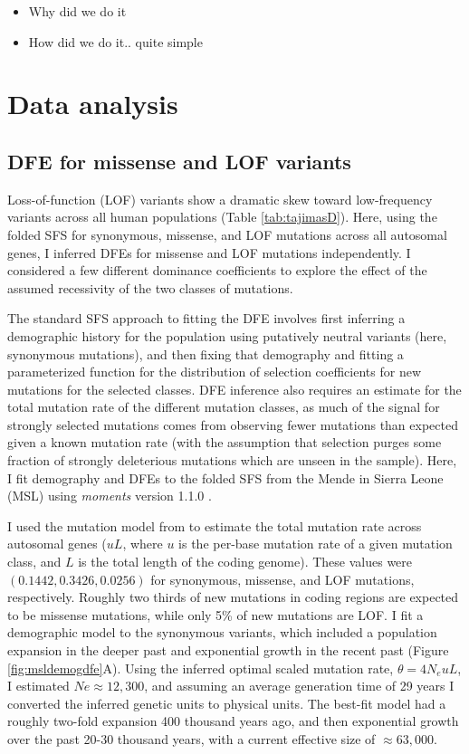 \documentclass[]{article}
\begin{document}
\begin{itemize}
    \item Why did we do it
    \item How did we do it.. quite simple
\end{itemize}

\section{Data analysis}

\subsection{DFE for missense and LOF variants}

Loss-of-function (LOF) variants show a dramatic skew toward low-frequency
variants across all human populations (Table \ref{tab:tajimasD}). Here, using
the folded SFS for synonymous, missense, and LOF mutations across all autosomal
genes, I inferred DFEs for missense and LOF mutations independently. I
considered a few different dominance coefficients to explore the effect of the
assumed recessivity of the two classes of mutations.

The standard SFS approach to fitting the DFE involves first inferring a
demographic history for the population using putatively neutral variants (here,
synonymous mutations), and then fixing that demography and fitting a
parameterized function for the distribution of selection coefficients for new
mutations for the selected classes. DFE inference also requires an estimate for
the total mutation rate of the different mutation classes, as much of the
signal for strongly selected mutations comes from observing fewer mutations
than expected given a known mutation rate (with the assumption that selection
purges some fraction of strongly deleterious mutations which are unseen in the
sample). Here, I fit demography and DFEs to the folded SFS from the Mende in
Sierra Leone (MSL) using \emph{moments} version 1.1.0 \citep{Jouganous2017-pq}.

I used the mutation model from \citet{Karczewski2020-le} to estimate the total
mutation rate across autosomal genes (\(uL\), where \(u\) is the per-base
mutation rate of a given mutation class, and \(L\) is the total length of the
coding genome). These values were \((0.1442, 0.3426, 0.0256)\) for synonymous,
missense, and LOF mutations, respectively. Roughly two thirds of new mutations
in coding regions are expected to be missense mutations, while only 5\% of new
mutations are LOF. I fit a demographic model to the synonymous variants, which
included a population expansion in the deeper past and exponential growth in
the recent past (Figure \ref{fig:msldemogdfe}A). Using the inferred optimal
scaled mutation rate, \(\theta=4N_euL\), I estimated \(Ne\approx12,300\), and
assuming an average generation time of 29 years I converted the inferred
genetic units to physical units. The best-fit model had a roughly two-fold
expansion 400 thousand years ago, and then exponential growth over the past
20-30 thousand years, with a current effective size of \(\approx 63,000\).
\end{document}
